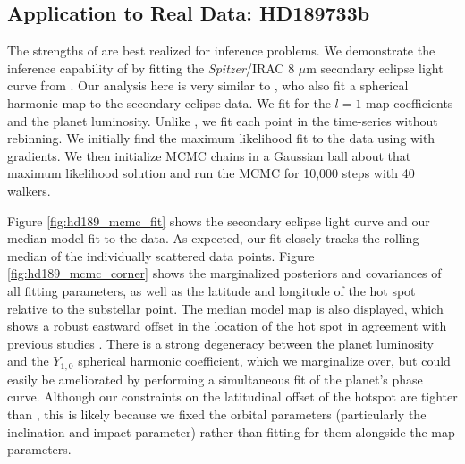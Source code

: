 \documentclass[modern]{aastex61}
\begin{document}
\subsection{Application to Real Data: HD189733b}
\label{sec:hd189}

The strengths of \starry are best realized for inference problems. We demonstrate the inference capability of \starry by fitting the \textit{Spitzer}/IRAC 8 $\mu$m secondary eclipse light curve from  \citet{Knutson2007}. Our analysis here is very similar to \citet{Majeau2012}, who also fit a spherical harmonic map to the secondary eclipse data. We fit for the $l = 1$ map coefficients and the planet luminosity. Unlike \citet{Majeau2012}, we fit each point in the time-series without rebinning. We initially find the maximum likelihood fit to the data using \starry with gradients. We then initialize MCMC \citep{Foreman-Mackey2013} chains in a Gaussian ball about that maximum likelihood solution and run the MCMC for 10,000 steps with 40 walkers. 

Figure \ref{fig:hd189_mcmc_fit} shows the secondary eclipse light curve and our median model fit to the data. As expected, our fit closely tracks the rolling median of the individually scattered data points. Figure \ref{fig:hd189_mcmc_corner} shows the marginalized posteriors and covariances of all fitting parameters, as well as the latitude and longitude of the hot spot relative to the substellar point. The median model map is also displayed, which shows a robust eastward offset in the location of the hot spot in agreement with previous studies \citep{Knutson2007, Majeau2012}. There is a strong degeneracy between the planet luminosity and the $Y_{1,0}$ spherical harmonic coefficient, which we marginalize over, but could easily be ameliorated by performing a simultaneous fit of the planet's phase curve. Although our constraints on the latitudinal offset of the hotspot are tighter than \citet{Majeau2012}, this is likely because we fixed the orbital parameters (particularly the inclination and impact parameter) rather than fitting for them alongside the map parameters. 
\end{document}
